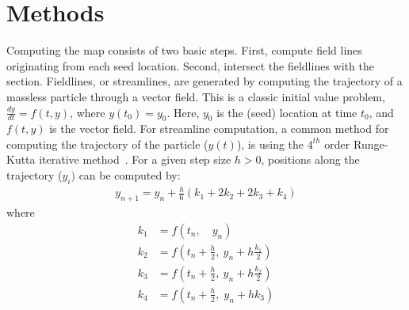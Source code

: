 \section{Methods}
\label{sec:method}

Computing the \poincare map consists of two basic steps. First, compute field lines originating from each seed location. Second, intersect the fieldlines with the \poincare section.
Fieldlines, or streamlines, are generated by computing the trajectory of a massless particle through a  vector field. 
This is a classic initial value problem, $\frac{dy}{dt} = f(t,y)$, where $y(t_0) = y_0$. Here, $y_0$ is the (seed) location at time $t_0$, and $f(t,y)$ is the vector field. For streamline computation, a common method for computing the trajectory of the particle ($y(t)$), is using the $4^{th}$ order Runge-Kutta iterative method~\cite{PresTeukVettFlan92}. For a given step size $h > 0$, positions along the trajectory ($y_i)$ can be computed by:
\begin{align}
    y_{n+1} = y_n  + \frac{h}{6} (k_1 + 2k_2 + 2k_3 + k_4)
    \label{eq:RK4}
\end{align}
\vspace{-.1in}
where
\begin{align*}
k_1 &= f(t_n,\quad y_n) \\
k_2 &= f(t_n+\frac{h}{2},\ y_n + h\frac{k_1}{2}) \\
k_3 &= f(t_n+\frac{h}{2},\: y_n + h\frac{k_2}{2}) \\
k_4 &= f(t_n+\frac{h}{2},\; y_n + hk_3)
\end{align*}
\vspace{-.3in}


